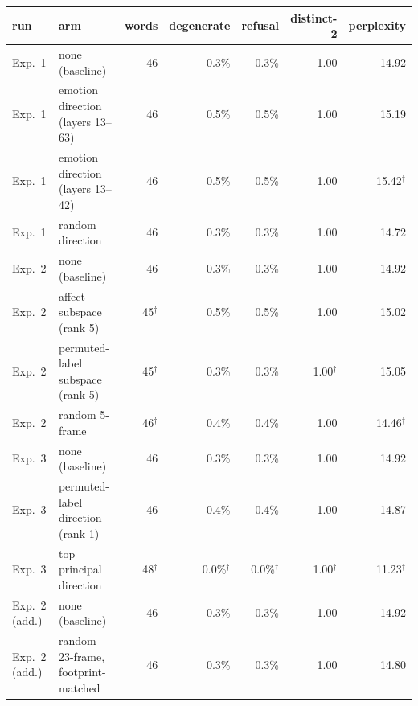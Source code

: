 \begin{tabular}{llrrrrr}
\toprule
run & arm & words & degenerate & refusal & distinct-2 & perplexity \\
\midrule
Exp.~1 & none (baseline) & 46 & 0.3\% & 0.3\% & 1.00 & 14.92 \\
Exp.~1 & emotion direction (layers 13--63) & 46 & 0.5\% & 0.5\% & 1.00 & 15.19 \\
Exp.~1 & emotion direction (layers 13--42) & 46 & 0.5\% & 0.5\% & 1.00 & 15.42$^{\dagger}$ \\
Exp.~1 & random direction & 46 & 0.3\% & 0.3\% & 1.00 & 14.72 \\
\midrule
Exp.~2 & none (baseline) & 46 & 0.3\% & 0.3\% & 1.00 & 14.92 \\
Exp.~2 & affect subspace (rank 5) & 45$^{\dagger}$ & 0.5\% & 0.5\% & 1.00 & 15.02 \\
Exp.~2 & permuted-label subspace (rank 5) & 45$^{\dagger}$ & 0.3\% & 0.3\% & 1.00$^{\dagger}$ & 15.05 \\
Exp.~2 & random 5-frame & 46$^{\dagger}$ & 0.4\% & 0.4\% & 1.00 & 14.46$^{\dagger}$ \\
\midrule
Exp.~3 & none (baseline) & 46 & 0.3\% & 0.3\% & 1.00 & 14.92 \\
Exp.~3 & permuted-label direction (rank 1) & 46 & 0.4\% & 0.4\% & 1.00 & 14.87 \\
Exp.~3 & top principal direction & 48$^{\dagger}$ & 0.0\%$^{\dagger}$ & 0.0\%$^{\dagger}$ & 1.00$^{\dagger}$ & 11.23$^{\dagger}$ \\
\midrule
Exp.~2 (add.) & none (baseline) & 46 & 0.3\% & 0.3\% & 1.00 & 14.92 \\
Exp.~2 (add.) & random 23-frame, footprint-matched & 46 & 0.3\% & 0.3\% & 1.00 & 14.80 \\
\bottomrule
\end{tabular}
